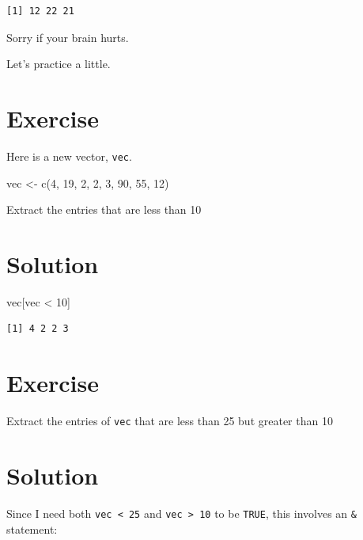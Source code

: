 \documentclass[
  letterpaper,
  DIV=11,
  numbers=noendperiod]{scrreprt}
\newenvironment{Shaded}{\begin{snugshade}}{\end{snugshade}}
\newcommand{\DecValTok}[1]{\textcolor[rgb]{0.68,0.00,0.00}{#1}}
\newcommand{\FunctionTok}[1]{\textcolor[rgb]{0.28,0.35,0.67}{#1}}
\newcommand{\NormalTok}[1]{\textcolor[rgb]{0.00,0.23,0.31}{#1}}
\newcommand{\OtherTok}[1]{\textcolor[rgb]{0.00,0.23,0.31}{#1}}
\newcommand{\SpecialCharTok}[1]{\textcolor[rgb]{0.37,0.37,0.37}{#1}}
\begin{document}
\begin{verbatim}
[1] 12 22 21
\end{verbatim}

Sorry if your brain hurts.

Let's practice a little.

\section{Exercise}

Here is a new vector, \texttt{vec}.

\begin{Shaded}
\begin{Highlighting}[]
\NormalTok{vec }\OtherTok{\textless{}{-}} \FunctionTok{c}\NormalTok{(}\DecValTok{4}\NormalTok{, }\DecValTok{19}\NormalTok{, }\DecValTok{2}\NormalTok{, }\DecValTok{2}\NormalTok{, }\DecValTok{3}\NormalTok{, }\DecValTok{90}\NormalTok{, }\DecValTok{55}\NormalTok{, }\DecValTok{12}\NormalTok{)}
\end{Highlighting}
\end{Shaded}

Extract the entries that are less than 10

\section{Solution}

\begin{Shaded}
\begin{Highlighting}[]
\NormalTok{vec[vec }\SpecialCharTok{\textless{}} \DecValTok{10}\NormalTok{]}
\end{Highlighting}
\end{Shaded}

\begin{verbatim}
[1] 4 2 2 3
\end{verbatim}

\section{Exercise}

Extract the entries of \texttt{vec} that are less than 25 but greater
than 10

\section{Solution}

Since I need both \texttt{vec\ \textless{}\ 25} and
\texttt{vec\ \textgreater{}\ 10} to be \texttt{TRUE}, this involves an
\texttt{\&} statement:
\end{document}
